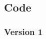 \documentclass{article}
\begin{document}
\lipsum[1]\\

\lipsum[2]\\

\lipsum[3]\\

\lipsum[4]\\

\lipsum[5]

\subsection*{Code}

\subsubsection*{Version 1}
\end{document}
